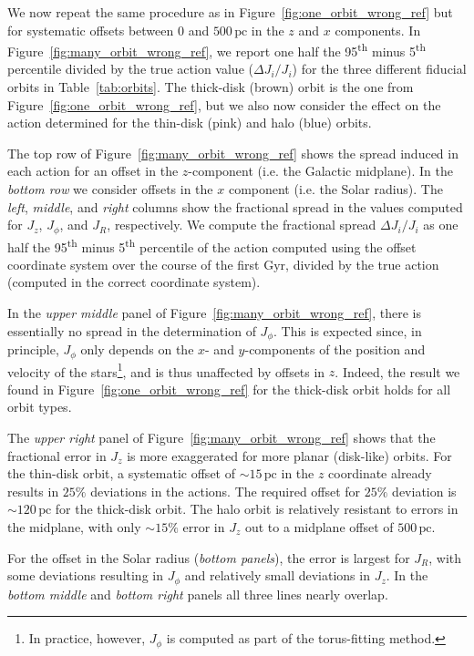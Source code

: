 \documentclass[twocolumn]{aastex62}
\newcommand{\pc}{\text{pc}}
\newcommand{\Gyr}{\text{Gyr}}
\newcommand{\uth}{\textsuperscript{th}}
\newcommand{\thincolor}{pink}
\newcommand{\thickcolor}{brown}
\newcommand{\halocolor}{blue}
\begin{document}
We now repeat the same procedure as in Figure~\ref{fig:one_orbit_wrong_ref}
but for systematic offsets between $0$ and $500\,\pc$ in the $z$ and $x$
components. In Figure~\ref{fig:many_orbit_wrong_ref}, we report one half the
95\uth{} minus 5\uth{} percentile divided by the true action value ($\Delta
J_i/J_i$) for the three different fiducial orbits in Table~\ref{tab:orbits}.
The thick-disk (\thickcolor) orbit is the one from
Figure~\ref{fig:one_orbit_wrong_ref}, but we also now consider the effect on
the action determined for the thin-disk (\thincolor) and halo (\halocolor)
orbits.

The top row of Figure~\ref{fig:many_orbit_wrong_ref} shows the spread induced
in each action for an offset in the $z$-component (i.e. the Galactic
midplane). In the {\em bottom row} we consider offsets in the $x$ component
(i.e. the Solar radius). The {\em left}, {\em middle}, and {\em right} columns
show the fractional spread in the values computed for $J_z$, $J_{\phi}$, and $J_R$,
respectively. We compute the fractional spread $\Delta J_i/J_i$ as one half
the 95\uth{} minus 5\uth{} percentile of the action computed using the offset
coordinate system over the course of the first $\Gyr$, divided by the true
action (computed in the correct coordinate system).

In the {\em upper middle} panel of Figure~\ref{fig:many_orbit_wrong_ref},
there is essentially no spread in the determination of $J_{\phi}$. This is expected
since, in principle, $J_{\phi}$ only depends on the $x$- and $y$-components of the
position and velocity of the stars\footnote{In practice, however, $J_{\phi}$ is
computed as part of the torus-fitting method.}, and is thus unaffected by
offsets in $z$. Indeed, the result we found in
Figure~\ref{fig:one_orbit_wrong_ref} for the thick-disk orbit holds for all
orbit types.
 
The {\em upper right} panel of Figure~\ref{fig:many_orbit_wrong_ref} shows
that the fractional error in $J_z$ is more exaggerated for more planar
(disk-like) orbits. For the thin-disk orbit, a systematic offset of
$\sim15\,\pc$ in the $z$ coordinate already results in $25\%$ deviations in
the actions. The required offset for $25\%$ deviation is $\sim120\,\pc$ for
the thick-disk orbit. The halo orbit is relatively resistant to errors in the
midplane, with only $\sim15\%$ error in $J_z$ out to a midplane offset of
$500\,\pc$.

For the offset in the Solar radius ({\em bottom panels}), the error is largest
for $J_R$, with some deviations resulting in $J_{\phi}$ and relatively small
deviations in $J_z$. In the {\em bottom middle} and {\em bottom right} panels
all three lines nearly overlap.
\end{document}
